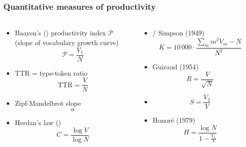 \documentclass[t]{beamer} %
\begin{document}
\begin{frame}
  \frametitle{Quantitative measures of productivity}
  \framesubtitle{\citep{Tweedie:Baayen:98,Baayen:01}}

  \footnotesize
  \begin{columns}[c]
        \begin{column}{6cm}
      \ungap[1.2]
      \begin{itemize}
      \item Baayen's (\citeyear{Baayen:91}) productivity index $\mathcal{P}$\\
        (slope of vocabulary growth curve)
        \[
        \mathcal{P} = \frac{V_1}{N}
        \]
      \item TTR = type-token ratio
        \[
        \text{TTR} = \frac{V}{N}
        \]
      \item Zipf-Mandelbrot slope
        \[
        a
        \]
      \item Herdan's law (\citeyear{Herdan:64})
        \[
        C = \frac{\log V}{\log N}
        \]
      \end{itemize}
    \end{column}
    \begin{column}{6cm}
      \begin{itemize}
      \item<2-> \citet{Yule:44} /  Simpson (1949) 
        \[
          K = 10\,000\cdot \frac{\sum_m m^2 V_m - N}{N^2}
        \]
      \item<2-> Guiraud (1954)
        \[
          R = \frac{V}{\sqrt{N}}
        \]
      \item<2-> \citet{Sichel:75}
        \[
          S = \frac{V_2}{V}
        \]
      \item<2-> Honoré (1979)
        \[
          H = \frac{\log N}{1 - \frac{V_1}{V}}
        \]
      \end{itemize}
    \end{column}
  \end{columns}  
\end{frame}
\end{document}
